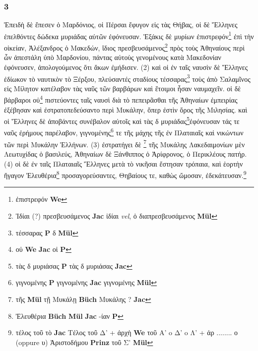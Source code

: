 \subsubsection*{3} \textgreek{Ἐπειδὴ δὲ ἔπεσεν ὁ Μαρδόνιος, οἱ Πέρσαι ἔφυγον εἰς τὰς Θήβας, οἱ δὲ Ἕλληνες ἐπελθόντες δώδεκα μυριάδας αὐτῶν ἐφόνευσαν. Ἑξάκις δὲ μυρίων ἐπιστρεφόν}\footnote{\textgreek{ἐπιστρεφόν}  \textbf{We}} \textgreek{ἐπὶ τὴν οἰκείαν, Ἀλέξανδρος ὁ Μακεδών, ἴδιος πρεσβευσάμενος}\footnote{\textgreek{Ἰδίαι} (?) \textgreek{πρεσβευσάμενος} \textbf{Jac} \textgreek{ ἰδίαι} \textit{vel}, \textgreek{ὀ διαπρεσβευσάμενος} \textbf{Mül}} \textgreek{πρὸς τοὺς Ἀθηναίους περὶ ὧν ἀπεστάλη ὑπὸ  Μαρδονίου, πάντας αὐτοὺς γενομένους κατὰ Μακεδονίαν ἐφόνευσεν, ἀπολογούμενος ὅτι ἄκων ἐμήδισεν.  (2) καὶ οἱ ἐν ταῖς ναυσὶν δὲ Ἕλληνες ἐδίωκον τὸ ναυτικὸν τὸ Ξέρξου, πλεύσαντές  σταδίους τέσσαρας}\footnote{\textgreek{τέσσαρας}  \textbf{P}  \textgreek{δ\textsubscript{\ladd{,}}} \textbf{Mül}} \textgreek{τοὺς ἀπὸ Σαλαμῖνος εἰς Μίλητον κατέλαβον τὰς ναῦς τῶν βαρβάρων καὶ ἕτοιμοι ἦσαν ναυμαχεῖν. οἱ δὲ βάρβαροι οὐ}\footnote{\textgreek{οὐ}  \textbf{We} \textbf{Jac} \textgreek{οἱ}  \textbf{P}} \textgreek{πιστεύοντες ταῖς ναυσὶ διὰ τὸ πεπειρᾶσθαι τῆς Ἀθηναίων ἐμπειρίας ἐξέβησαν καὶ ἐστρατοπεδεύσαντο περὶ Μυκάλην, ὅπερ ἐστὶν ὄρος τῆς  Μιλησίας. καὶ οἱ Ἕλληνες δὲ ἀποβάντες συνέβαλον αὐτοῖς καὶ τὰς δ μυριάδας}\footnote{\textgreek{τὰς δ μυριάσας}   \textbf{P} \textgreek{ τὰς δ μυριάσας} \textbf{Jac}}\textgreek{ἐφόνευσαν τάς τε ναῦς ἐρήμους παρέλαβον, γιγνομένης}\footnote{\textgreek{γιγνομένης} \textbf{P}\textgreek{ γιγνομένης} \textbf{Jac} \textgreek{ γιγνομένης} \textbf{Mül}} \textgreek{τε τῆς μάχης τῆς ἐν Πλαταιαῖς καὶ νικώντων τῶν περὶ Μυκάλην Ἑλλήνων. (3) ἐστρατήγει δὲ }\footnote{\textgreek{ τῆς} \textbf{Mül} \textgreek{ τῇ Μυκάλῃ}  \textbf{Büch} \textgreek{ Μυκάλης} ? \textbf{Jac}} \textgreek{τῆς Μυκάλης Λακεδαιμονίων μὲν Λεωτυχίδας ὁ βασιλεύς, Ἀθηναίων δὲ Ξάνθιππος ὁ Ἀρίφρονος,  ὁ Περικλέους πατήρ. (4) οἱ δὲ ἐν ταῖς Πλαταιαῖς Ἕλληνες μετὰ τὸ νικῆσαι ἔστησαν τρόπαια, καὶ ἑορτὴν ἤγαγον Ἐλευθέρια}\footnote{\textgreek{Ἐλευθέρια}  \textbf{Büch} \textbf{Mül} \textbf{Jac} \textgreek{-ίαν}  \textbf{P}} \textgreek{ προσαγορεύσαντες, Θηβαίους τε, καθὼς ὤμοσαν, ἐδεκάτευσαν.}\footnote{\textgreek{τέλος τοῦ \star\star τὸ} \textbf{Jac} \textgreek{Τέλος τοῦ Δ'} + \textgreek{ἀρχὴ}  \textbf{We} \textgreek{τοῦ Α'} o \textgreek{Δ'} o \textgreek{Λ'} + \textgreek{ἀρ ........ ο} (oppure \textgreek{υ}) \textgreek{Ἀριστοδήμου}   \textbf{Prinz} \textgreek{τοῦ Σ'} \textbf{Mül}}

